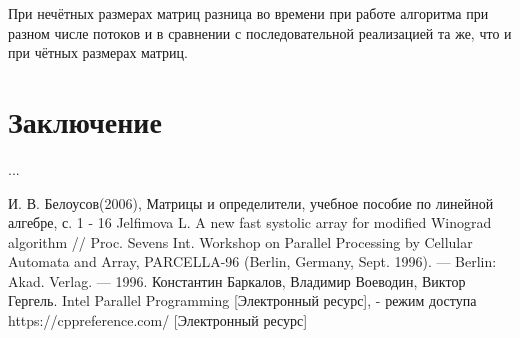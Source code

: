 \documentclass[12pt, a4paper]{report}
\begin{document}
 	При нечётных размерах матриц разница во времени при работе алгоритма при разном числе потоков и в сравнении с последовательной реализацией та же, что и при чётных размерах матриц.

	\chapter*{Заключение}
	...
	
	\newpage
	
	\begin{thebibliography}{}
	И. В. Белоусов(2006), Матрицы и определители, учебное пособие по линейной алгебре, с. 1 - 16
	 Jelfimova L. A new fast systolic array for modified Winograd algorithm // Proc. Sevens Int. Workshop on Parallel Processing by Cellular Automata and Array, PARCELLA-96 (Berlin, Germany, Sept. 1996). — Berlin: Akad. Verlag. — 1996.
	 Константин Баркалов, Владимир Воеводин, Виктор Гергель. Intel Parallel Programming [Электронный ресурс], - режим доступа
	 https://cppreference.com/ [Электронный ресурс]
	\end{thebibliography}
\end{document}
